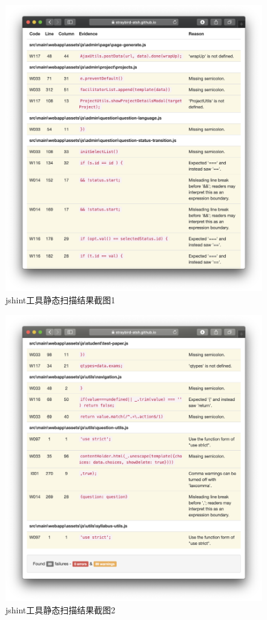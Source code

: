 \documentclass[hyperref, a4paper]{ctexart}
\begin{document}
\begin{figure}
\centering
\includegraphics{screenshots/pic3.jpg}
\caption{jshint工具静态扫描结果截图1}
\end{figure}

\begin{figure}
\centering
\includegraphics{screenshots/pic4.jpg}
\caption{jshint工具静态扫描结果截图2}
\end{figure}
\end{document}
